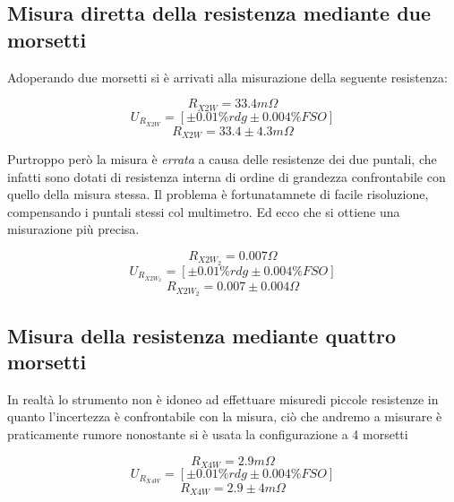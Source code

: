 \documentclass[a4paper]{article}
\begin{document}
\subsection{Misura diretta della resistenza mediante due morsetti}
Adoperando due morsetti si è arrivati alla misurazione della seguente resistenza:
\begin{Large}
	\begin{equation}
		R_{X2W}= 33.4 m\Omega
	\end{equation}
	\begin{equation}
		U_{R_{X2W}} = [\pm 0.01\%rdg \pm 0.004\% FSO]
	 \end{equation}
	 \begin{equation}
		R_{X2W} = 33.4 \pm 4.3m \Omega
	 \end{equation}
\end{Large}
Purtroppo però la misura è \emph{errata} a causa delle resistenze dei due puntali, che infatti sono dotati di resistenza interna di ordine di grandezza confrontabile con quello della misura stessa.
Il problema è fortunatamnete di facile risoluzione, compensando i puntali stessi col multimetro. Ed ecco che si ottiene una misurazione più precisa.

\begin{Large}
	\begin{equation}
		R_{X2W_{2}} = 0.007 \Omega
	 \end{equation}
	\begin{equation}
		U_{R_{X2W_{2}}} = [\pm 0.01\%rdg \pm 0.004\% FSO]
	 \end{equation}
	 \begin{equation}
		R_{X2W_{2}} = 0.007 \pm 0.004 \Omega
	 \end{equation}
\end{Large}
\subsection{Misura della resistenza mediante quattro morsetti}
In realtà lo strumento non è idoneo ad effettuare misuredi piccole resistenze in quanto l'incertezza è confrontabile con la misura, 
ciò che andremo a misurare è praticamente rumore nonostante si è usata la configurazione a 4 morsetti 
\begin{Large}
	\begin{equation}
		R_{X4W}= 2.9m \Omega
	\end{equation}
	\begin{equation}
		U_{R_{X4W}} = [\pm 0.01\%rdg \pm 0.004\% FSO]
	 \end{equation}
	 \begin{equation}
		R_{X4W} = 2.9\pm 4m \Omega
	 \end{equation}
\end{Large}
\end{document}
